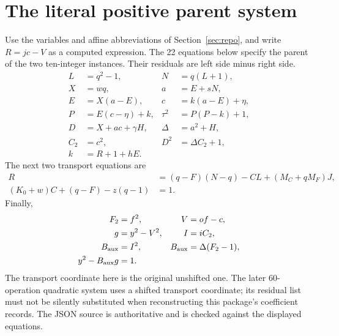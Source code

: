 \documentclass[11pt,a4paper]{article}
\theoremstyle{definition}
\begin{document}
\appendix
\section{The literal positive parent system}
\label{app:parent}
Use the variables and affine abbreviations of
Section~\ref{sec:repo}, and write $R=jc-V$ as a computed
expression. The 22 equations below specify the parent of the
two ten-integer instances. Their residuals are left side minus right
side.
\begin{align*}
 L&=q^2-1,&N&=q(L+1),\\
 X&=wq,&a&=E+sN,\\
 E&=X(a-E),&c&=k(a-E)+\eta,\\
 P&=E(c-\eta)+k,&\tau^2&=P(P-k)+1,\\
 D&=X+ac+\gamma H,&\Delta&=a^2+H,\\
 C_2&=c^2,&D^2&=\Delta C_2+1,\\
 k&=R+1+hE.
\end{align*}
The next two transport equations are
\begin{align*}
 R&=(q-F)(N-q)-CL+(M_C+qM_F)J,\\
 (K_0+w)C+(q-F)-z(q-1)&=1.
\end{align*}
Finally,
\begin{align*}
 F_2&=f^2,&V&=of-c,\\
 g&=y^2-V^2,&I&=iC_2,\\
 B_{\rm aux}&=I^2,&B_{\rm aux}&=\Delta(F_2-1),\\
 y^2-B_{\rm aux}g&=1.
\end{align*}
The transport coordinate here is the original unshifted one.
The later 60-operation quadratic system uses a shifted transport
coordinate; its residual list must not be silently substituted
when reconstructing this package's coefficient records.
The JSON source is authoritative and is checked against the
displayed equations.
\end{document}
